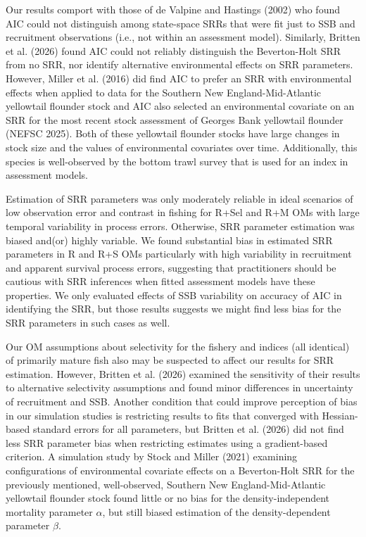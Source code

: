 \documentclass[
  12pt,
]{article}
\begin{document}
Our results comport with those of {de Valpine and Hastings} (2002) who
found AIC could not distinguish among state-space SRRs that were fit
just to SSB and recruitment observations (i.e., not within an assessment
model). Similarly, Britten et al. (2026) found AIC could not reliably
distinguish the Beverton-Holt SRR from no SRR, nor identify alternative
environmental effects on SRR parameters. However, Miller et al. (2016)
did find AIC to prefer an SRR with environmental effects when applied to
data for the Southern New England-Mid-Atlantic yellowtail flounder stock
and AIC also selected an environmental covariate on an SRR for the most
recent stock assessment of Georges Bank yellowtail flounder (NEFSC
2025). Both of these yellowtail flounder stocks have large changes in
stock size and the values of environmental covariates over time.
Additionally, this species is well-observed by the bottom trawl survey
that is used for an index in assessment models.

Estimation of SRR parameters was only moderately reliable in ideal
scenarios of low observation error and contrast in fishing for R+Sel and
R+M OMs with large temporal variability in process errors. Otherwise,
SRR parameter estimation was biased and(or) highly variable. We found
substantial bias in estimated SRR parameters in R and R+S OMs
particularly with high variability in recruitment and apparent survival
process errors, suggesting that practitioners should be cautious with
SRR inferences when fitted assessment models have these properties. We
only evaluated effects of SSB variability on accuracy of AIC in
identifying the SRR, but those results suggests we might find less bias
for the SRR parameters in such cases as well.

Our OM assumptions about selectivity for the fishery and indices (all
identical) of primarily mature fish also may be suspected to affect our
results for SRR estimation. However, Britten et al. (2026) examined the
sensitivity of their results to alternative selectivity assumptions and
found minor differences in uncertainty of recruitment and SSB. Another
condition that could improve perception of bias in our simulation
studies is restricting results to fits that converged with Hessian-based
standard errors for all parameters, but Britten et al. (2026) did not
find less SRR parameter bias when restricting estimates using a
gradient-based criterion. A simulation study by Stock and Miller (2021)
examining configurations of environmental covariate effects on a
Beverton-Holt SRR for the previously mentioned, well-observed, Southern
New England-Mid-Atlantic yellowtail flounder stock found little or no
bias for the density-independent mortality parameter \(\alpha\), but
still biased estimation of the density-dependent parameter \(\beta\).
\end{document}
